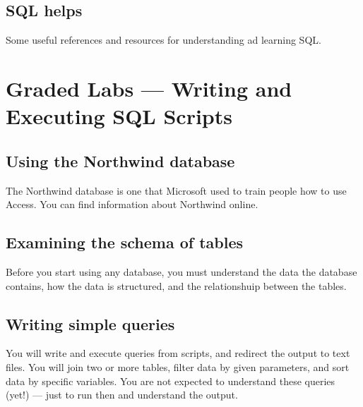 \documentclass{article}
\begin{document}
        \subsection{SQL helps}
Some useful references and resources for understanding ad learning SQL.

    \section{Graded Labs --- Writing and Executing SQL Scripts}


        \subsection{Using the Northwind database}
The Northwind database is one that Microsoft used to train people how to use Access. You can find information about Northwind online.
        \subsection{Examining the schema of tables}
       Before you start using any database, you must understand the data the database contains, how the data is structured, and the relationshuip between the tables. 
        \subsection{Writing simple queries}
        You will write and execute queries from scripts, and redirect the output to text files. You will join two or more tables, filter data by given parameters, and sort data by specific variables. You are not expected to understand these queries (yet!) --- just to run then and understand the output.
\end{document}
